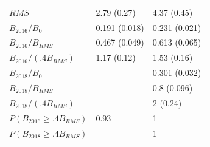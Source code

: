\documentclass[11pt]{book}
\begin{document}
\begin{longtable}[t]{lll}
$RMS$ & 2.79 (0.27) & 4.37 (0.45)\\
$B_{2016}/B_0$ & 0.191 (0.018) & 0.231 (0.021)\\
$B_{2016}/B_{RMS}$ & 0.467 (0.049) & 0.613 (0.065)\\
$B_{2016}/(.4B_{RMS})$ & 1.17 (0.12) & 1.53 (0.16)\\
$B_{2018}/B_0$ &  & 0.301 (0.032)\\
$B_{2018}/B_{RMS}$ &  & 0.8 (0.096)\\
$B_{2018}/(.4B_{RMS})$ &  & 2 (0.24)\\
$P(B_{2016} \geq .4B_{RMS})$ & 0.93 & 1\\
$P(B_{2018} \geq .4B_{RMS})$ &  & 1\\
\bottomrule
\end{longtable}
\endgroup{}

\newpage
\end{document}
